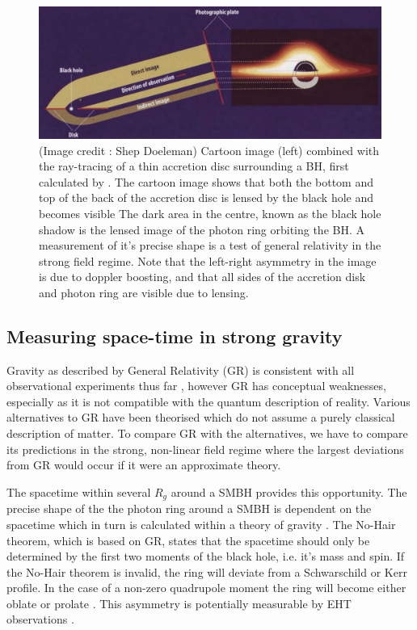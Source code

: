 \begin{figure}
\includegraphics[width=\columnwidth]{Images/lensed_cartoon}
\caption{(Image credit : Shep Doeleman) Cartoon image (left) combined with the ray-tracing of a thin accretion disc surrounding a BH, first calculated by \citet{Luminet_1979}. The cartoon image shows that both the bottom and top of the back of the accretion disc is lensed by the black hole and becomes visible The dark area in the centre, known as the black hole shadow is the lensed image of the photon ring orbiting the BH. A measurement of it's precise shape is a test of general relativity in the strong field regime. Note that the left-right asymmetry in the image is due to doppler boosting, and that all sides of the accretion disk and photon ring are visible due to lensing. \label{fig:grmhd}%
}

\end{figure}



\subsection{Measuring space-time in strong gravity}

Gravity as described by General Relativity (GR) is consistent with all observational experiments thus far \citep[e.g.][]{Kramer_2006}, however GR has conceptual weaknesses, especially as it is not compatible with the quantum description of reality. Various alternatives to GR have been theorised which do not assume a purely classical description of matter. To compare GR with the alternatives, we have to compare its predictions in the strong, non-linear field regime where the largest deviations from GR would occur if it were an approximate theory.


The spacetime within several $R_g$ around a SMBH provides this opportunity. The precise shape of the the photon ring around a SMBH is dependent on the spacetime which in turn is calculated within a theory of gravity \citep{Takahashi_2004}. The No-Hair theorem, which is based on GR, states that the spacetime should only be determined by the first two moments of the black hole, i.e. it's mass and spin. If the No-Hair theorem is invalid, the ring will deviate from a Schwarschild or Kerr profile. In the case of a non-zero quadrupole moment the ring will become either oblate or prolate \citep{Johannsen_2010}. This asymmetry is potentially measurable by EHT observations \citep{Broderick_2014}.

